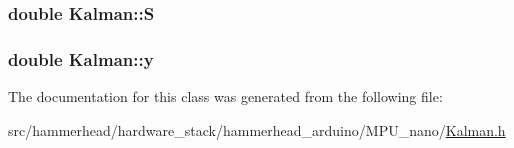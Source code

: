\subsubsection[{\texorpdfstring{S}{S}}]{\setlength{\rightskip}{0pt plus 5cm}double Kalman\+::S\hspace{0.3cm}{\ttfamily [private]}}\hypertarget{classKalman_aa1723b7b23799feaf0bf6fab81200ab3}{}\label{classKalman_aa1723b7b23799feaf0bf6fab81200ab3}
\subsubsection[{\texorpdfstring{y}{y}}]{\setlength{\rightskip}{0pt plus 5cm}double Kalman\+::y\hspace{0.3cm}{\ttfamily [private]}}\hypertarget{classKalman_a35803b99122580ce2538fcc6c10c58f8}{}\label{classKalman_a35803b99122580ce2538fcc6c10c58f8}


The documentation for this class was generated from the following file\+:\begin{DoxyCompactItemize}
\item 
src/hammerhead/hardware\+\_\+stack/hammerhead\+\_\+arduino/\+M\+P\+U\+\_\+nano/\hyperlink{Kalman_8h}{Kalman.\+h}\end{DoxyCompactItemize}
